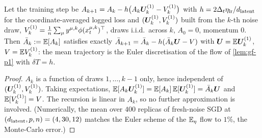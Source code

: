 \begin{proposition}\label{prop:sgdmean-p1}
Let the training step be $A_{k+1}=A_k-h\big(A_k\bm{U}^{(1)}_k-V^{(1)}_k\big)$ with $h=2\Delta_t\eta_{\rm lr}/d_{\mathrm{latent}}$ for the coordinate-averaged logged loss and $(\bm{U}^{(1)}_k,V^{(1)}_k)$ built from the $k$-th noise draw, $V^{(1)}_k=\tfrac1{n}\sum_\mu y^{\mu,k}\phi(x^{\mu,k}_t)^{\top}$, draws i.i.d.\ across $k$, $A_0=0$, momentum $0$. Then $\bar A_k:=\mathbb{E}[A_k]$ satisfies exactly $\bar A_{k+1}=\bar A_k-h(\bar A_k\bm{U}-V)$ with $\bm{U}=\mathbb{E}\bm{U}^{(1)}_k$, $V=\mathbb{E} V^{(1)}_k$: the mean trajectory is the Euler discretisation of the flow of \cref{lem:gf-p1} with $\delta T=h$.
\end{proposition}
\begin{proof}
$A_k$ is a function of draws $1,\dots,k-1$ only, hence independent of $(\bm{U}^{(1)}_k,V^{(1)}_k)$. Taking expectations, $\mathbb{E}[A_k\bm{U}^{(1)}_k]=\mathbb{E}[A_k]\,\mathbb{E}[\bm{U}^{(1)}_k]=\bar A_k\bm{U}$ and $\mathbb{E}[V^{(1)}_k]=V$. The recursion is linear in $A_k$, so no further approximation is involved. (Numerically, the mean over $400$ replicas of fresh-noise SGD at $(d_{\mathrm{latent}},p,n)=(4,30,12)$ matches the Euler scheme of the $\mathbb{E}_\eta$ flow to $1\%$, the Monte-Carlo error.)
\end{proof}

